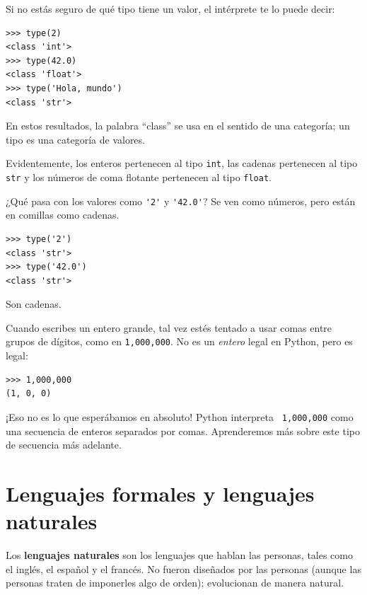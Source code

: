 \documentclass[10pt]{book}
\begin{document}
Si no estás seguro de qué tipo tiene un valor, el intérprete te lo
puede decir:

\begin{verbatim}
>>> type(2)
<class 'int'>
>>> type(42.0)
<class 'float'>
>>> type('Hola, mundo')
<class 'str'>
\end{verbatim}
%
En estos resultados, la palabra ``class'' se usa en el sentido de
una categoría; un tipo es una categoría de valores.

Evidentemente, los enteros pertenecen al tipo {\tt int},
las cadenas pertenecen al tipo {\tt str} y los números de
coma flotante pertenecen al tipo {\tt float}.

¿Qué pasa con los valores como \verb"'2'" y \verb"'42.0'"?
Se ven como números, pero están en comillas como
cadenas.

\begin{verbatim}
>>> type('2')
<class 'str'>
>>> type('42.0')
<class 'str'>
\end{verbatim}
%
Son cadenas.

Cuando escribes un entero grande, tal vez estés tentado a usar comas
entre grupos de dígitos, como en {\tt 1,000,000}.  No es un
{\em entero} legal en Python, pero es legal:

\begin{verbatim}
>>> 1,000,000
(1, 0, 0)
\end{verbatim}
%
¡Eso no es lo que esperábamos en absoluto!  Python interpreta {\tt
  1,000,000} como una secuencia de enteros separados por comas.  Aprenderemos
más sobre este tipo de secuencia más adelante.




\section{Lenguajes formales y lenguajes naturales}

Los {\bf lenguajes naturales} son los lenguajes que hablan las personas,
tales como el inglés, el español y el francés.  No fueron diseñados
por las personas (aunque las personas traten de imponerles algo de orden);
evolucionan de manera natural.
\end{document}
